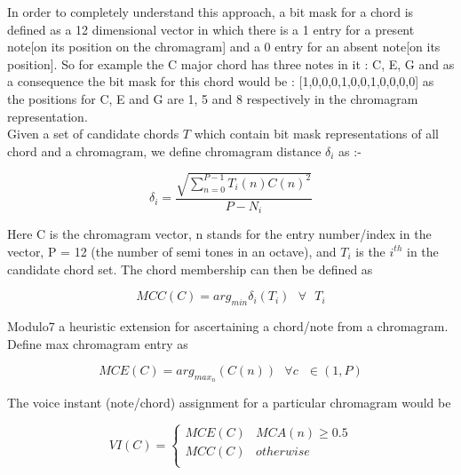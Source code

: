 \noindent In order to completely understand this approach, a bit mask for a chord is defined as a 12 dimensional vector in which there is a 1 entry for a present note[on its position on the chromagram] and a 0 entry for an absent note[on its position]. So for example the C major chord has three notes in it : C, E, G and as a consequence the bit mask for this chord would be : [1,0,0,0,1,0,0,1,0,0,0,0] as the positions for C, E and G are 1, 5 and 8 respectively in the chromagram representation. \\

\noindent Given a set of candidate chords $T$ which contain bit mask representations of all chord and a chromagram, we define chromagram distance $\delta_i$ as \cite{chord-detection}:-

\begin{equation}
\delta_i = \frac{\sqrt{\sum_{n = 0}^{P - 1} T_i(n)C(n)^2}}{P - N_i}
\end{equation}

\noindent Here C is the chromagram vector, n stands for the entry number/index in the vector, P = 12 (the number of semi tones in an octave), and $T_i$ is the $i^{th}$ in the candidate chord set. The chord membership can then be defined as 

\begin{equation}
MCC(C) = arg_{min} \delta_i (T_i) \ \ \ \forall \ \ \ T_i
\end{equation}

\noindent Modulo7 a heuristic extension for ascertaining a chord/note from a chromagram. Define max chromagram entry as 

\begin{equation}
MCE(C) = arg_{max_n}(C(n)) \ \ \ \forall c \ \ \ \in (1, P)
\end{equation}

\noindent The voice instant (note/chord) assignment for a particular chromagram would be 

\begin{equation}
VI(C) = \begin{cases}
      MCE(C) & MCA(n) \geq 0.5 \\
      MCC(C) & otherwise \\  \end{cases}
\end{equation}

